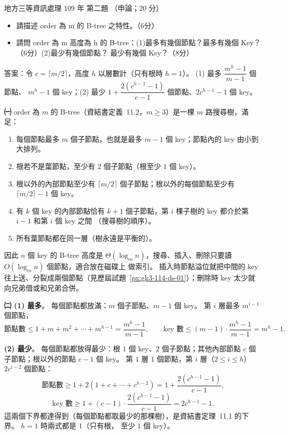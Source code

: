 \begin{pastexam}[label={px:df3-109-ds-02}]{地方三等資訊處理 109 年 第二題}
（申論；20 分）

\begin{itemize}[leftmargin=2.2em]
\item[㈠] 請描述 order 為 m 的 B-tree 之特性。（6分）
\item[㈡] 請問 order 為 m 高度為 h 的 B-tree：(1)最多有幾個節點？最多有幾個 Key？（6分）(2)最少有幾個節點？
最少有幾個 Key？（8分）
\end{itemize}
\end{pastexam}

\begin{pastsoln}
答案：令 $c = \lceil m/2 \rceil$，高度 $h$ 以層數計（只有根時 $h = 1$）。 (1) 最多 $\dfrac{m^h - 1}{m - 1}$ 個節點、
$m^h - 1$ 個 key；(2) 最少 $1 + \dfrac{2(c^{h-1} - 1)}{c - 1}$ 個節點、$2c^{h-1} - 1$ 個 key。

\textbf{㈠} order 為 $m$ 的 B-tree（資結書定義~11.2，$m \ge 3$）是一棵 $m$ 路搜尋樹，滿足：
\begin{enumerate}[label=(\arabic*)]
\item 每個節點最多 $m$ 個子節點，也就是最多 $m - 1$ 個 key；節點內的 key 由小到大排列。
\item 根若不是葉節點，至少有 $2$ 個子節點（根至少 $1$ 個 key）。
\item 根以外的內部節點至少有 $\lceil m/2 \rceil$ 個子節點；根以外的每個節點至少有 $\lceil m/2 \rceil - 1$ 個 key。
\item 有 $k$ 個 key 的內部節點恰有 $k + 1$ 個子節點，第 $i$ 棵子樹的 key 都介於第 $i - 1$ 和第 $i$ 個 key 之間
（搜尋樹的順序）。
\item 所有葉節點都在同一層（樹永遠是平衡的）。
\end{enumerate}
因此 $n$ 個 key 的 B-tree 高度是 $\Theta(\log_m n)$，搜尋、插入、刪除只要讀 $O(\log_m n)$ 個節點，適合放在磁碟上
做索引。 插入時節點溢位就把中間的 key 往上送、分裂成兩個節點（見歷屆試題~\ref{px:gk3-114-ds-01}）；刪除時
key 太少就向兄弟借或和兄弟合併。

\textbf{㈡ (1) 最多}。 每個節點都放滿：$m$ 個子節點、$m - 1$ 個 key。 第 $i$ 層最多 $m^{i-1}$ 個節點，
\[
\text{節點數} \le 1 + m + m^2 + \cdots + m^{h-1} = \frac{m^h - 1}{m - 1},
\qquad
\text{key 數} \le (m - 1) \cdot \frac{m^h - 1}{m - 1} = m^h - 1.
\]

\textbf{(2) 最少}。 每個節點都放得最少：根 $1$ 個 key、$2$ 個子節點；其他內部節點 $c$ 個子節點；根以外的節點
$c - 1$ 個 key。 第 $1$ 層 $1$ 個節點，第 $i$ 層（$2 \le i \le h$）$2c^{i-2}$ 個節點：
\[
\text{節點數} \ge 1 + 2(1 + c + \cdots + c^{h-2}) = 1 + \frac{2(c^{h-1} - 1)}{c - 1},
\]
\[
\text{key 數} \ge 1 + (c - 1) \cdot \frac{2(c^{h-1} - 1)}{c - 1} = 2c^{h-1} - 1.
\]
這兩個下界都達得到（每個節點都取最少的那棵樹），是資結書定理~11.1 的下界。 $h = 1$ 時兩式都是 $1$（只有根，
至少 $1$ 個 key）。


\end{pastsoln}
